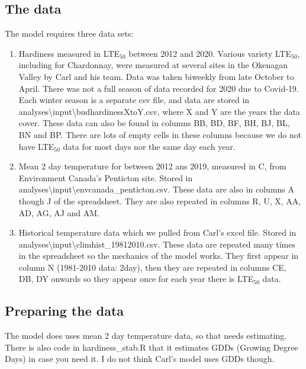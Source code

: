 \documentclass[11pt,letter]{article}
\begin{document}
\subsection{The data}

The model requires three data sets: 
\begin{enumerate}
	\item Hardiness measured in LTE$_{50}$ between 2012 and 2020. Various variety LTE${_50}$, including for Chardonnay, were measured at several sites in the Okenagan Valley by Carl and his team. Data was taken biweekly from late October to April. There was not a full season of data recorded for 2020 due to Covid-19. Each winter season is a separate csv file, and data are stored in analyses\textbackslash input\textbackslash budhardinessXtoY.csv, where X and Y are the years the data cover. These data can also be found in columns BB, BD, BF, BH, BJ, BL, BN and BP. There are lots of empty cells in these columns because we do not have LTE$_{50}$ data for most days nor the same day each year. 

	\item Mean 2 day temperature for between 2012 ans 2019, measured in \textdegree{}C, from Environment Canada's Penticton site. Stored in analyses\textbackslash input\textbackslash envcanada\_penticton.csv. These data are also in columns A though J of the spreadsheet. They are also repeated in columns R, U, X, AA, AD, AG, AJ and AM. 

	\item Historical temperature data which we pulled from Carl's excel file. Stored in analyses\textbackslash input\textbackslash climhist\_19812010.csv. These data are repeated many times in the spreadsheet so the mechanics of the model works. They first appear in column N (1981-2010 data: 2day), then they are repeated in columns CE, DB, DY onwards so they appear once for each year there is LTE$_{50}$ data.   

\end{enumerate}

\subsection{Preparing the data}
The model does uses mean 2 day temperature data, so that needs estimating. There is also code in hardiness\_stab.R that it estimates GDDs (Growing Degree Days) in case you need it. I do not think Carl's model uses GDDs though. 
\end{document}
